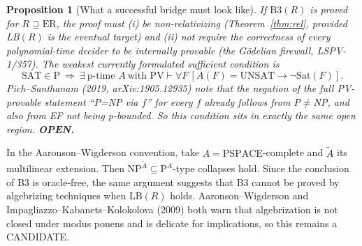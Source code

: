 \documentclass[11pt]{article}
\newtheorem{proposition}[theorem]{Proposition}
\begin{document}
\begin{proposition}[What a successful bridge must look like]
If $\mathrm{B3}(R)$ is proved for $R\supseteq\mathrm{ER}$, the proof must (i) be non-relativizing (Theorem~\ref{thm:rel}, provided LB$(R)$ is the eventual target) and (ii) not require the correctness of \emph{every} polynomial-time decider to be internally provable (the G\"odelian firewall, LSPV-1/357). The weakest currently formulated sufficient condition is
\[
\mathrm{SAT}\in\mathrm P\ \Longrightarrow\ \exists\ \text{p-time }A\ \text{with } \mathrm{PV}\vdash \forall F\,[A(F)=\mathrm{UNSAT}\to \neg\mathrm{Sat}(F)].
\]
Pich--Santhanam (2019, arXiv:1905.12935) note that the \emph{negation} of the full PV-provable statement ``P=NP via $f$'' for every $f$ already follows from P$\neq$NP, and also from EF not being p-bounded. So this condition sits in exactly the same open region. \textbf{OPEN.}
\end{proposition}

\begin{remark}\label{rem:alg}
In the Aaronson--Wigderson convention, take $A=\mathrm{PSPACE}$-complete and $\tilde A$ its multilinear extension. Then $\mathrm{NP}^{\tilde A}\subseteq\mathrm P^{A}$-type collapses hold. Since the conclusion of B3 is oracle-free, the same argument suggests that B3 cannot be proved by algebrizing techniques when LB$(R)$ holds. Aaronson--Wigderson and Impagliazzo--Kabanets--Kolokolova (2009) both warn that algebrization is not closed under modus ponens and is delicate for implications, so this remains a CANDIDATE.
\end{remark}
\end{document}
